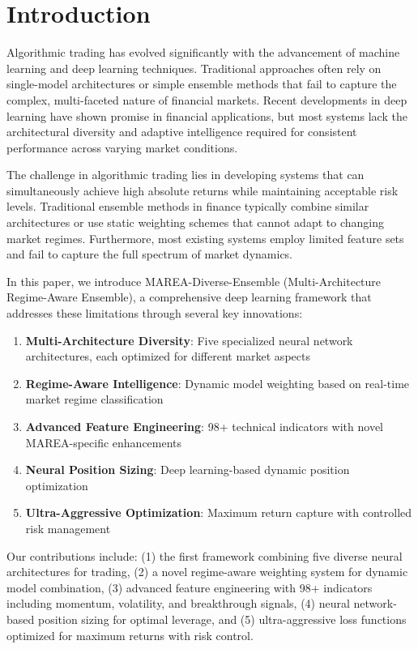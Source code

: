 \documentclass[10pt,twocolumn]{article}
\begin{document}
\section{Introduction}

Algorithmic trading has evolved significantly with the advancement of machine learning and deep learning techniques. Traditional approaches often rely on single-model architectures or simple ensemble methods that fail to capture the complex, multi-faceted nature of financial markets. Recent developments in deep learning have shown promise in financial applications, but most systems lack the architectural diversity and adaptive intelligence required for consistent performance across varying market conditions.

The challenge in algorithmic trading lies in developing systems that can simultaneously achieve high absolute returns while maintaining acceptable risk levels. Traditional ensemble methods in finance typically combine similar architectures or use static weighting schemes that cannot adapt to changing market regimes. Furthermore, most existing systems employ limited feature sets and fail to capture the full spectrum of market dynamics.

In this paper, we introduce MAREA-Diverse-Ensemble (Multi-Architecture Regime-Aware Ensemble), a comprehensive deep learning framework that addresses these limitations through several key innovations:

\begin{enumerate}[itemsep=2pt]
\item \textbf{Multi-Architecture Diversity}: Five specialized neural network architectures, each optimized for different market aspects
\item \textbf{Regime-Aware Intelligence}: Dynamic model weighting based on real-time market regime classification
\item \textbf{Advanced Feature Engineering}: 98+ technical indicators with novel MAREA-specific enhancements
\item \textbf{Neural Position Sizing}: Deep learning-based dynamic position optimization
\item \textbf{Ultra-Aggressive Optimization}: Maximum return capture with controlled risk management
\end{enumerate}

Our contributions include: (1) the first framework combining five diverse neural architectures for trading, (2) a novel regime-aware weighting system for dynamic model combination, (3) advanced feature engineering with 98+ indicators including momentum, volatility, and breakthrough signals, (4) neural network-based position sizing for optimal leverage, and (5) ultra-aggressive loss functions optimized for maximum returns with risk control.
\end{document}
